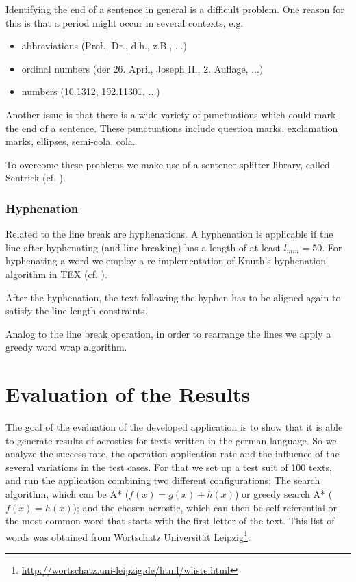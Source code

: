 \documentclass[11pt]{reportAlternative}
\begin{document}
Identifying the end of a sentence in general is a difficult problem. One reason for this is that a period
might occur in several contexts, e.g.

\begin{itemize}

	\item abbreviations (Prof., Dr., d.h., z.B., ...)
	\item ordinal numbers (der 26. April, Joseph II., 2. Auflage, ...)
	\item numbers (10.1312, 192.11301, ...)

\end{itemize}

Another issue is that there is a wide variety of punctuations which could mark the end of a sentence. These punctuations include question marks, exclamation marks, ellipses, semi-cola, cola.

To overcome these problems we make use of a sentence-splitter library, called Sentrick (cf. \cite{Sentrick}).

\subsection{Hyphenation}
Related to the line break are hyphenations. A hyphenation is applicable if the line after hyphenating (and line breaking) has a length of at least $l_{min}=50$.
For hyphenating a word we employ a re-implementation of Knuth's hyphenation algorithm in TEX (cf. \cite{Hyphenation}).

After the hyphenation, the text following the hyphen has to be aligned again to satisfy the line length constraints.

Analog to the line break operation, in order to rearrange the lines we apply a greedy word wrap algorithm.

\chapter{Evaluation of the Results}
The goal of the evaluation of the developed application is to show that it is able to generate results of acrostics for texts written in the german language. So we analyze the success rate, the operation application rate and the influence of the several variations in the test cases. For that we set up a test suit of 100 texts, and run the application combining two different configurations: The search algorithm, which can be A* ($f(x) = g(x) + h(x)$) or greedy search A* ($f(x) = h(x)$); and the chosen acrostic, which can then be self-referential or the most common word that starts with the first letter of the text. This list of words was obtained from Wortschatz Universität Leipzig\footnote{\url{http://wortschatz.uni-leipzig.de/html/wliste.html}}.
\end{document}
